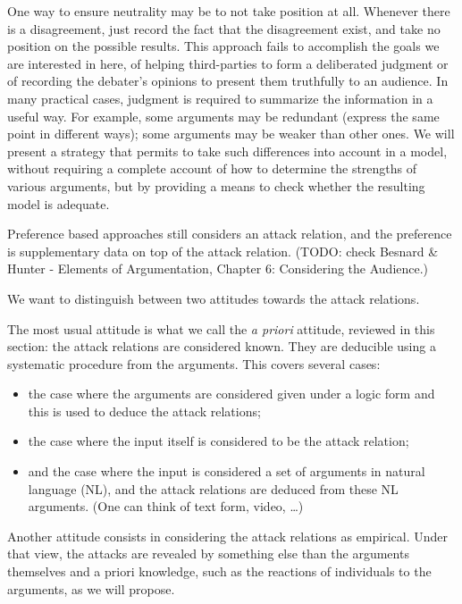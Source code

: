 \documentclass[version=3.21, pagesize, twoside=off, bibliography=totoc, DIV=calc, fontsize=12pt, a4paper, french, english]{scrartcl}
\begin{document}
One way to ensure neutrality may be to not take position at all. Whenever there is a disagreement, just record the fact that the disagreement exist, and take no position on the possible results. This approach fails to accomplish the goals we are interested in here, of helping third-parties to form a deliberated judgment or of recording the debater’s opinions to present them truthfully to an audience. In many practical cases, judgment is required to summarize the information in a useful way. For example, some arguments may be redundant (express the same point in different ways); some arguments may be weaker than other ones. We will present a strategy that permits to take such differences into account in a model, without requiring a complete account of how to determine the strengths of various arguments, but by providing a means to check whether the resulting model is adequate.

Preference based approaches still considers an attack relation, and the preference is supplementary data on top of the attack relation. (TODO: check Besnard \& Hunter - Elements of Argumentation, Chapter 6: Considering the Audience.) 

We want to distinguish between two attitudes towards the attack relations. 

The most usual attitude is what we call the \emph{a priori} attitude, reviewed in this section: the attack relations are considered known. They are deducible using a systematic procedure from the arguments. This covers several cases:
\begin{itemize}
\item the case where the arguments are considered given under a logic form and this is used to deduce the attack relations;
\item the case where the input itself is considered to be the attack relation;
\item and the case where the input is considered a set of arguments in natural language (NL), and the attack relations are deduced from these NL arguments. (One can think of text form, video, …)
\end{itemize}

Another attitude consists in considering the attack relations as empirical. Under that view, the attacks are revealed by something else than the arguments themselves and a priori knowledge, such as the reactions of individuals to the arguments, as we will propose.
\end{document}
